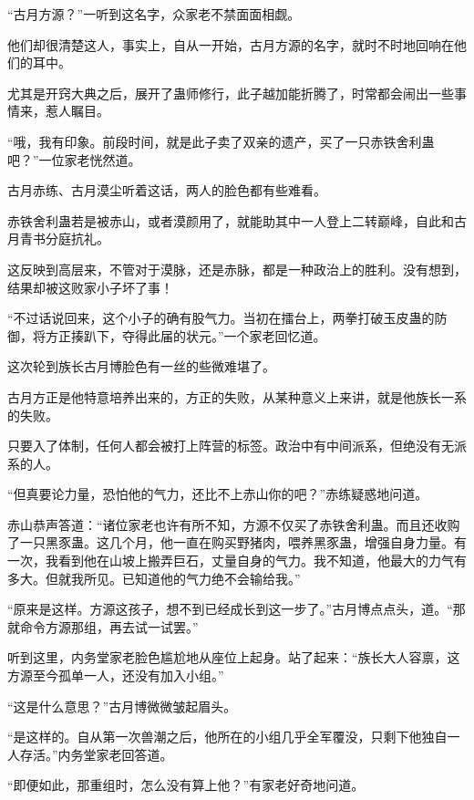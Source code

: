 
\begin{this_body}

“古月方源？”一听到这名字，众家老不禁面面相觑。

他们却很清楚这人，事实上，自从一开始，古月方源的名字，就时不时地回响在他们的耳中。

尤其是开窍大典之后，展开了蛊师修行，此子越加能折腾了，时常都会闹出一些事情来，惹人瞩目。

“哦，我有印象。前段时间，就是此子卖了双亲的遗产，买了一只赤铁舍利蛊吧？”一位家老恍然道。

古月赤练、古月漠尘听着这话，两人的脸色都有些难看。

赤铁舍利蛊若是被赤山，或者漠颜用了，就能助其中一人登上二转巅峰，自此和古月青书分庭抗礼。

这反映到高层来，不管对于漠脉，还是赤脉，都是一种政治上的胜利。没有想到，结果却被这败家小子坏了事！

“不过话说回来，这个小子的确有股气力。当初在擂台上，两拳打破玉皮蛊的防御，将方正揍趴下，夺得此届的状元。”一个家老回忆道。

这次轮到族长古月博脸色有一丝的些微难堪了。

古月方正是他特意培养出来的，方正的失败，从某种意义上来讲，就是他族长一系的失败。

只要入了体制，任何人都会被打上阵营的标签。政治中有中间派系，但绝没有无派系的人。

“但真要论力量，恐怕他的气力，还比不上赤山你的吧？”赤练疑惑地问道。

赤山恭声答道：“诸位家老也许有所不知，方源不仅买了赤铁舍利蛊。而且还收购了一只黑豕蛊。这几个月，他一直在购买野猪肉，喂养黑豕蛊，增强自身力量。有一次，我看到他在山坡上搬弄巨石，丈量自身的气力。我不知道，他最大的力气有多大。但就我所见。已知道他的气力绝不会输给我。”

“原来是这样。方源这孩子，想不到已经成长到这一步了。”古月博点点头，道。“那就命令方源那组，再去试一试罢。”

听到这里，内务堂家老脸色尴尬地从座位上起身。站了起来：“族长大人容禀，这方源至今孤单一人，还没有加入小组。”

“这是什么意思？”古月博微微皱起眉头。

“是这样的。自从第一次兽潮之后，他所在的小组几乎全军覆没，只剩下他独自一人存活。”内务堂家老回答道。

“即便如此，那重组时，怎么没有算上他？”有家老好奇地问道。


\end{this_body}
